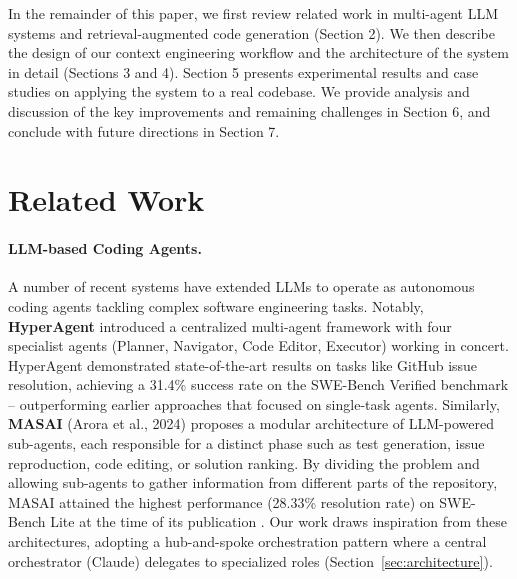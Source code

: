 \documentclass[11pt]{article}
\begin{document}
In the remainder of this paper, we first review related work in multi-agent LLM systems and retrieval-augmented code generation (Section 2). We then describe the design of our context engineering workflow and the architecture of the system in detail (Sections 3 and 4). Section 5 presents experimental results and case studies on applying the system to a real codebase. We provide analysis and discussion of the key improvements and remaining challenges in Section 6, and conclude with future directions in Section 7.

\section{Related Work}
\paragraph{LLM-based Coding Agents.}
A number of recent systems have extended LLMs to operate as autonomous coding agents tackling complex software engineering tasks. Notably, \textbf{HyperAgent} \cite{hyperagent2024} introduced a centralized multi-agent framework with four specialist agents (Planner, Navigator, Code Editor, Executor) working in concert. HyperAgent demonstrated state-of-the-art results on tasks like GitHub issue resolution, achieving a 31.4\% success rate on the SWE-Bench Verified benchmark – outperforming earlier approaches that focused on single-task agents. Similarly, \textbf{MASAI} (Arora et al., 2024) proposes a modular architecture of LLM-powered sub-agents, each responsible for a distinct phase such as test generation, issue reproduction, code editing, or solution ranking. By dividing the problem and allowing sub-agents to gather information from different parts of the repository, MASAI attained the highest performance (28.33\% resolution rate) on SWE-Bench Lite at the time of its publication \cite{masai2024}. Our work draws inspiration from these architectures, adopting a hub-and-spoke orchestration pattern where a central orchestrator (Claude) delegates to specialized roles (Section~\ref{sec:architecture}).
\end{document}

